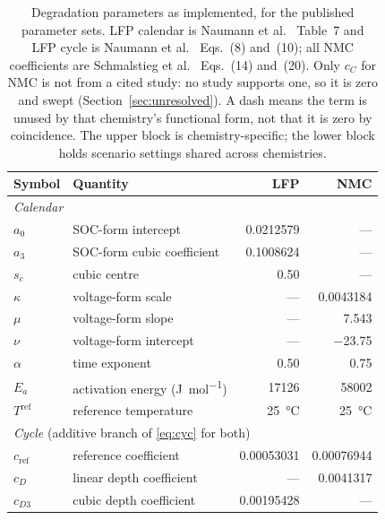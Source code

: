 \documentclass[11pt,a4paper]{article}
\begin{document}
\begin{table}[htbp]
\centering
\caption{Degradation parameters as implemented, for the published
parameter sets. LFP calendar is Naumann et al.~\cite{naumann2018}
Table~7 and LFP cycle is Naumann et al.~\cite{naumann2020} Eqs.~(8)
and~(10); all NMC coefficients are Schmalstieg et
al.~\cite{schmalstieg2014} Eqs.~(14) and~(20). Only $c_C$ for NMC is
not from a cited study: no study supports one, so it is zero and swept
(Section~\ref{sec:unresolved}). A dash means the term is unused by that
chemistry's functional form, not that it is zero by coincidence. The
upper block is chemistry-specific; the lower block holds scenario
settings shared across chemistries.}
\label{tab:params}
\begin{tabular}{llrr}
\toprule
Symbol & Quantity & LFP & NMC \\
\midrule
\multicolumn{4}{l}{\emph{Calendar}} \\
$a_0$              & SOC-form intercept            & \num{0.0212579} & ---          \\
$a_3$              & SOC-form cubic coefficient    & \num{0.1008624} & ---          \\
$s_c$              & cubic centre                  & \num{0.50}      & ---          \\
$\kappa$           & voltage-form scale            & ---             & \num{0.0043184} \\
$\mu$              & voltage-form slope            & ---             & \num{7.543}  \\
$\nu$              & voltage-form intercept        & ---             & \num{-23.75} \\
$\alpha$           & time exponent                 & \num{0.50}      & \num{0.75}   \\
$E_a$              & activation energy (\si{\joule\per\mole}) & \num{17126} & \num{58002} \\
$T^{\mathrm{ref}}$ & reference temperature         & \SI{25}{\celsius} & \SI{25}{\celsius} \\
\midrule
\multicolumn{4}{l}{\emph{Cycle} (additive branch of \eqref{eq:cyc} for both)} \\
$c_{\mathrm{ref}}$ & reference coefficient         & \num{0.00053031} & \num{0.00076944} \\
$c_D$              & linear depth coefficient      & ---              & \num{0.0041317} \\
$c_{D3}$           & cubic depth coefficient       & \num{0.00195428} & ---          \\

\end{tabular}
\end{table}
\end{document}
